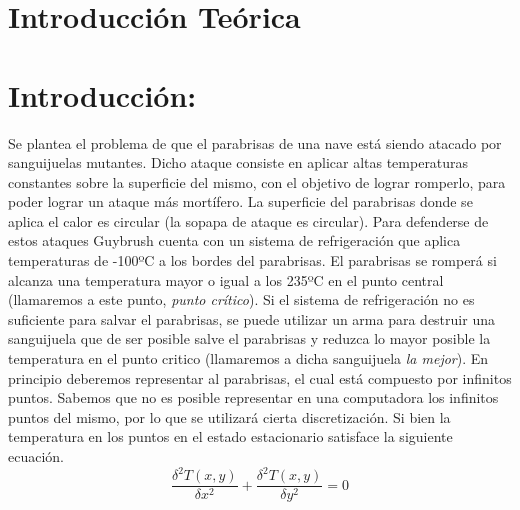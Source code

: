 \section{Introducción Teórica}
%

\section{Introducción:}


Se plantea el problema de que el parabrisas de una nave está siendo atacado por sanguijuelas mutantes. Dicho ataque consiste en aplicar altas temperaturas constantes sobre la superficie del mismo, con el objetivo de lograr romperlo, para poder lograr un ataque más mortífero. La superficie del parabrisas donde se aplica el calor es circular (la sopapa de ataque es circular). \newline
Para defenderse de estos ataques Guybrush cuenta con un sistema de refrigeración que aplica temperaturas de -100ºC a los bordes del parabrisas. El parabrisas se romperá si alcanza una temperatura mayor o igual a los 235ºC en el punto central (llamaremos a este punto, \textit{punto crítico}).\newline
Si el sistema de refrigeración no es suficiente para salvar el parabrisas, se puede utilizar un arma para destruir una sanguijuela que de ser posible salve el parabrisas y reduzca lo mayor posible la temperatura en el punto critico (llamaremos a dicha sanguijuela \textit{la mejor}). 
En principio deberemos representar al parabrisas, el cual está compuesto por infinitos puntos. Sabemos que no es posible representar en una computadora los infinitos puntos del mismo, por lo que se utilizará cierta discretización.
Si bien la temperatura en los puntos en el estado estacionario satisface la siguiente ecuación.\\

\begin{equation}
\frac{\delta ^2 T(x,y)}{\delta x^2}+\frac{\delta ^2 T(x,y)}{\delta y^2}=0 
\end{equation}\\

